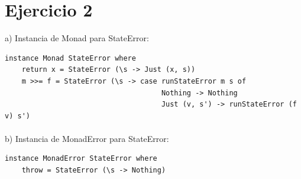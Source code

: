 \documentclass{article}
\begin{document}
\newpage
\section*{Ejercicio 2}
a) Instancia de Monad para StateError: 
\begin{lstlisting}
instance Monad StateError where
    return x = StateError (\s -> Just (x, s))
    m >>= f = StateError (\s -> case runStateError m s of
                                     Nothing -> Nothing
                                     Just (v, s') -> runStateError (f v) s')
\end{lstlisting}
\paragraph{}
b) Instancia de MonadError para StateError: 
\begin{lstlisting}
instance MonadError StateError where
    throw = StateError (\s -> Nothing)

\end{lstlisting}
\end{document}
